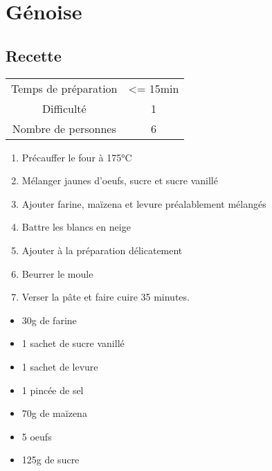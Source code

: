\newpage
\section{Génoise}
    \label{sec:Génoise}
    \subsection{Recette}
    \vspace{1cm}


    \begin{center}
        \begin{tabular}{c|c}
            Temps de préparation & <= 15min \\
            Difficulté & 1 \\
            Nombre de personnes & 6 
        \end{tabular}
    \end{center}{}

    \vspace{1cm}
    \hline
    \vspace{1cm}

    \begin{minipage}{.7\textwidth}
        \begin{enumerate}
            \item Précauffer le four à 175°C
	    \item Mélanger jaunes d'oeufs, sucre et sucre vanillé
	    \item Ajouter farine, maïzena et levure préalablement mélangés
	    \item Battre les blancs en neige
	    \item Ajouter à la préparation délicatement
	    \item Beurrer le moule
	    \item Verser la pâte et faire cuire 35 minutes.

        \end{enumerate}
    \end{minipage}
    \begin{minipage}{.3\textwidth}
        \begin{flushleft}
        \begin{itemize}
            \item 30g de farine
	    \item 1 sachet de sucre vanillé
	    \item 1 sachet de levure
	    \item 1 pincée de sel
	    \item 70g de maïzena
	    \item 5 oeufs
	    \item 125g de sucre

        \end{itemize}
        \end{flushleft}
    \end{minipage}
    
